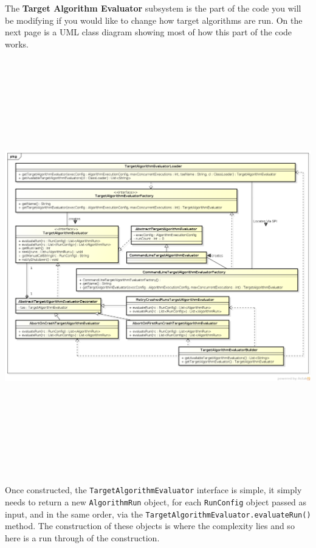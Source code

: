 \documentclass[manual.tex]{subfiles}
\begin{document}
\label{sec:target-algorithm-evaluators}

The \textbf{Target Algorithm Evaluator} subsystem is the part of the code you will be modifying if you would like to change how target algorithms are run. On the next page is a UML class diagram showing most of how this part of the code works.

\includegraphics[height=18cm,angle=270, trim=4cm 0cm 0cm 0cm clip=true]{tae.png} 

\vspace{15pt}
Once constructed, the \texttt{TargetAlgorithmEvaluator} interface is simple, it simply needs to return a new \texttt{AlgorithmRun} object, for each \texttt{RunConfig} object passed as input, and in the same order, via the \texttt{TargetAlgorithmEvaluator.evaluateRun()} method. The construction of these objects is where the complexity lies and so here is a run through of the construction.
\end{document}

